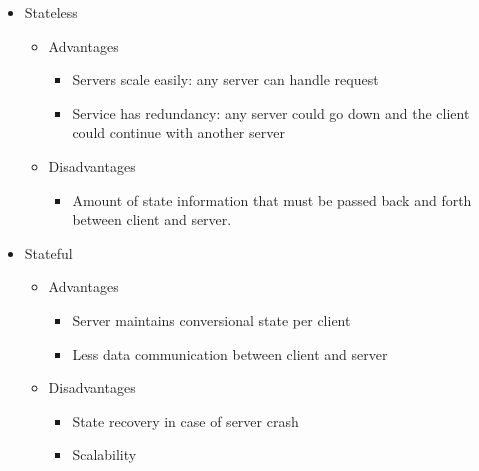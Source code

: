 \begin{itemize}
\tightlist
\item
  Stateless

  \begin{itemize}
  \tightlist
  \item
    Advantages

    \begin{itemize}
    \tightlist
    \item
      Servers scale easily: any server can handle request
    \item
      Service has redundancy: any server could go down and the client
      could continue with another server
    \end{itemize}
  \item
    Disadvantages

    \begin{itemize}
    \tightlist
    \item
      Amount of state information that must be passed back and forth
      between client and server.
    \end{itemize}
  \end{itemize}
\item
  Stateful

  \begin{itemize}
  \tightlist
  \item
    Advantages

    \begin{itemize}
    \tightlist
    \item
      Server maintains conversional state per client
    \item
      Less data communication between client and server
    \end{itemize}
  \item
    Disadvantages

    \begin{itemize}
    \tightlist
    \item
      State recovery in case of server crash
    \item
      Scalability
    \end{itemize}
  \end{itemize}
\end{itemize}

